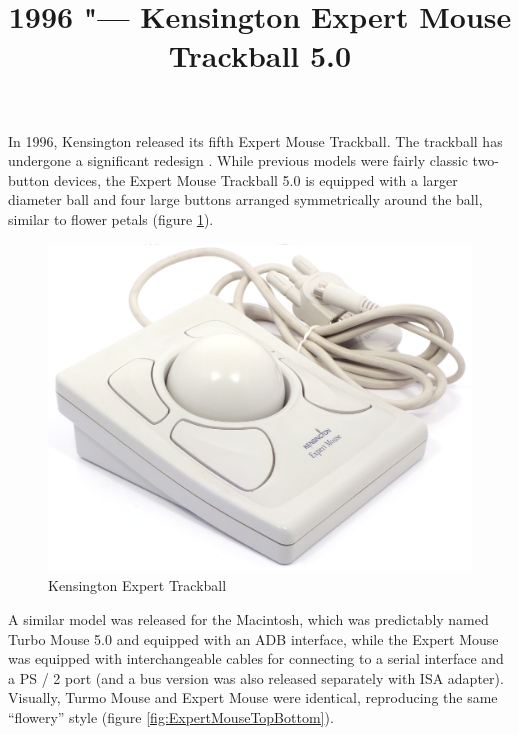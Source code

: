 \documentclass[11pt, a4paper]{article}
\begin{document}
\title{1996 "--- Kensington Expert Mouse Trackball 5.0}
\date{}
\maketitle
{}
In 1996, Kensington released its fifth Expert Mouse Trackball. The trackball has undergone a significant redesign \cite{KensingtonPC}. While previous models were fairly classic two-button devices, the Expert Mouse Trackball 5.0 is equipped with a larger diameter ball and four large buttons arranged symmetrically around the ball, similar to flower petals (figure \ref{fig:ExpertMousePic}).

\begin{figure}[h]
    \centering
    \includegraphics[scale=0.4]{1996_kensington_expert_trackball_5/pic_60.jpg}
    \caption{Kensington Expert Trackball}
    \label{fig:ExpertMousePic}
\end{figure}

A similar model was released for the Macintosh, which was predictably named Turbo Mouse 5.0 \cite{KensingtonMac} and equipped with an ADB interface, while the Expert Mouse was equipped with interchangeable cables for connecting to a serial interface and a PS / 2 port (and a bus version was also released separately with ISA adapter). Visually, Turmo Mouse and Expert Mouse were identical, reproducing the same “flowery” style (figure \ref{fig:ExpertMouseTopBottom}).
\end{document}
